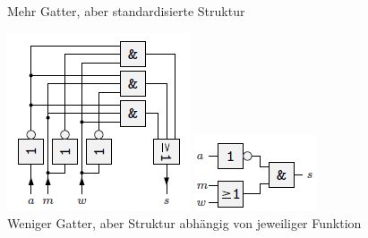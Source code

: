 \documentclass[12pt]{report}
\begin{document}
\begin{figure}[H]
  \begin{minipage}[t]{0.4\textwidth}
    \caption{Mehr Gatter, aber standardisierte Struktur}
    \includegraphics[width=\textwidth]{graphics/PLA_example_normal.png}
  \end{minipage}
  \hfill
  \begin{minipage}[t]{0.4\textwidth}
    \caption{Weniger Gatter, aber Struktur abhängig von jeweiliger Funktion}
    \centering
    \includegraphics[width=\textwidth]{graphics/PLA_example_original.png}
  \end{minipage}
\end{figure}
\end{document}
